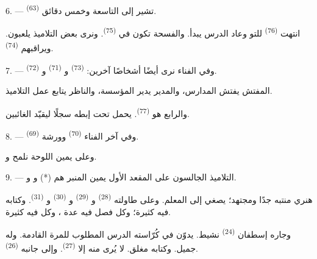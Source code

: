 \VUsaut{5.2mm}
\VUsaut{3.6mm}

6. ---  \textsuperscript{(63)} تشير إلى التاسعة وخمس دقائق.

انتهت  \textsuperscript{(76)} للتو وعاد الدرس يبدأ. والفسحة تكون
في  \textsuperscript{(75)}. ونرى بعض التلاميذ يلعبون. ويراقبهم
 \textsuperscript{(74)}.

7. --- وفي الفناء نرى أيضًا أشخاصًا آخرين: 
\textsuperscript{(73)} و \textsuperscript{(71)} و
\textsuperscript{(72)}.

المفتش يفتش المدارس، والمدير يدير المؤسسة، والناظر يتابع عمل التلاميذ.

والرابع هو  \textsuperscript{(77)}. يحمل تحت إبطه سجلًا ليقيّد
الغائبين.

8. --- وفي آخر الفناء  \textsuperscript{(70)} وورشة
 \textsuperscript{(69)}.

وعلى يمين اللوحة نلمح   و.


\VUsaut{2.4mm}

\VUsaut{3.0mm}

9. --- التلاميذ الجالسون على المقعد الأول يمين المنبر هم 
(*) و و.

هنري منتبه جدًا ومجتهد؛ يصغي إلى المعلم. وعلى طاولته 
\textsuperscript{(28)} و \textsuperscript{(29)} و
\textsuperscript{(30)} و \textsuperscript{(31)}. وكتابه فيه
 كثيرة؛ وكل فصل فيه عدة ، وكل  فيه
 كثيرة.

وجاره إسطفان \textsuperscript{(24)} نشيط. يدوّن في كُرّاسته الدرس المطلوب للمرة
القادمة. وله  جميل. وكتابه مغلق. لا يُرى منه إلا 
\textsuperscript{(27)}. وإلى جانبه  \textsuperscript{(26)}.

